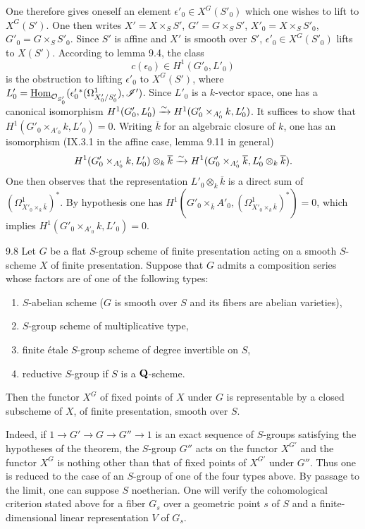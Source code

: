 One therefore gives oneself an element $\epsilon'_0\in X^G(S'_0)$ which one wishes to lift to $X^G(S')$. One then writes $X'=X\times_S S'$, $G'=G\times_S S'$, $X'_0=X\times_S S'_0$, $G'_0=G\times_S S'_0$. Since $S'$ is affine and $X'$ is smooth over $S'$, $\epsilon'_0\in X^G(S'_0)$ lifts to $X(S')$. According to lemma 9.4, the class
\[
c(\epsilon_0)\in H^1(G'_0,L'_0)
\]
is the obstruction to lifting $\epsilon'_0$ to $X^G(S')$, where $L'_0=\underline{\operatorname{Hom}}_{\mathcal{O}_{S'_0}}(\epsilon'_0{}^*(\Omega^1_{X'_0/S'_0}),\mathscr I')$. Since $L'_0$ is a $k$-vector space, one has a canonical isomorphism $H^1(G'_0,L'_0)\xrightarrow{\sim} H^1(G'_0\times_{A'_0}k,L'_0)$. It suffices to show that $H^1(G'_0\times_{A'_0}k,L'_0)=0$. Writing $\overline k$ for an algebraic closure of $k$, one has an isomorphism (IX.3.1 in the affine case, lemma 9.11 in general)
\[
H^1(G'_0\times_{A'_0}k,L'_0)\otimes_k\overline k
\xrightarrow{\sim} H^1(G'_0\times_{A'_0}\overline k,L'_0\otimes_k\overline k).
\]
One then observes that the representation $L'_0\otimes_k\overline k$ is a direct sum of $(\Omega^1_{X'_0\times_k\overline k})^*$. By hypothesis one has $H^1(G'_0\times_{\overline k}A'_0,(\Omega^1_{X'_0\times_k\overline k})^*)=0$, which implies $H^1(G'_0\times_{A'_0}k,L'_0)=0$.
\begin{corollary}{9.8}\label{XII.9.8}
Let $G$ be a flat $S$-group scheme of finite presentation acting on a smooth $S$-scheme $X$ of finite presentation. Suppose that $G$ admits a composition series whose factors are of one of the following types:
\begin{enumerate}[label=(\arabic*)]
\item $S$-abelian scheme (\ie $G$ is smooth over $S$ and its fibers are abelian varieties),
\item $S$-group scheme of multiplicative type,
\item finite étale $S$-group scheme of degree invertible on $S$,
\item reductive $S$-group if $S$ is a $\mathbf{Q}$-scheme.
\end{enumerate}
Then the functor $X^G$ of fixed points of $X$ under $G$ is representable by a closed subscheme of $X$, of finite presentation, smooth over $S$.
\end{corollary}
Indeed, if $1\to G'\to G\to G''\to1$ is an exact sequence of $S$-groups satisfying the hypotheses of the theorem, the $S$-group $G''$ acts on the functor $X^{G'}$ and the functor $X^G$ is nothing other than that of fixed points of $X^{G'}$ under $G''$. Thus one is reduced to the case of an $S$-group of one of the four types above. By passage to the limit, one can suppose $S$ noetherian. One will verify the cohomological criterion stated above for a fiber $G_s$ over a geometric point $s$ of $S$ and a finite-dimensional linear representation $V$ of $G_s$.

